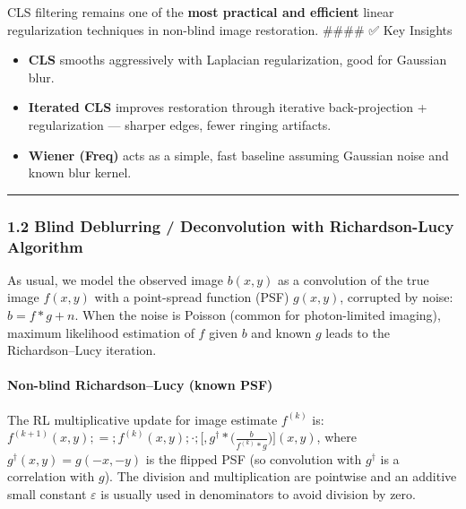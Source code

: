 \documentclass[11pt]{article}
\providecommand{\tightlist}{%
      \setlength{\itemsep}{0pt}\setlength{\parskip}{0pt}}
\begin{document}
CLS filtering remains one of the \textbf{most practical and efficient}
linear regularization techniques in non-blind image restoration.
\#\#\#\# ✅ Key Insights

\begin{itemize}
\tightlist
\item
  \textbf{CLS} smooths aggressively with Laplacian regularization, good
  for Gaussian blur.
\item
  \textbf{Iterated CLS} improves restoration through iterative
  back-projection + regularization --- sharper edges, fewer ringing
  artifacts.
\item
  \textbf{Wiener (Freq)} acts as a simple, fast baseline assuming
  Gaussian noise and known blur kernel.
\end{itemize}

\begin{center}\rule{0.5\linewidth}{0.5pt}\end{center}

\hypertarget{blind-deblurring-deconvolution-with-richardson-lucy-algorithm}{%
\subsubsection{\texorpdfstring{\textbf{1.2 Blind Deblurring /
Deconvolution with Richardson-Lucy
Algorithm}}{1.2 Blind Deblurring / Deconvolution with Richardson-Lucy Algorithm}}\label{blind-deblurring-deconvolution-with-richardson-lucy-algorithm}}

As usual, we model the observed image \(b(x,y)\) as a convolution of the
true image \(f(x,y)\) with a point-spread function (PSF) \(g(x,y)\),
corrupted by noise: \(b = f * g + n\). When the noise is Poisson (common
for photon-limited imaging), maximum likelihood estimation of \(f\)
given \(b\) and known \(g\) leads to the Richardson--Lucy iteration.

\hypertarget{non-blind-richardsonlucy-known-psf}{%
\paragraph{\texorpdfstring{\textbf{Non-blind Richardson--Lucy (known
PSF)}}{Non-blind Richardson--Lucy (known PSF)}}\label{non-blind-richardsonlucy-known-psf}}

The RL multiplicative update for image estimate \(f^{(k)}\) is:
\(f^{(k+1)}(x,y) ;=; f^{(k)}(x,y);\cdot; \bigg[, g^\dagger * \Big(\frac{b}{f^{(k)}*g}\Big)\bigg](x,y)\),
where \(g^\dagger(x,y)=g(-x,-y)\) is the flipped PSF (so convolution
with \(g^\dagger\) is a correlation with \(g\)). The division and
multiplication are pointwise and an additive small constant
\(\varepsilon\) is usually used in denominators to avoid division by
zero.
\end{document}
